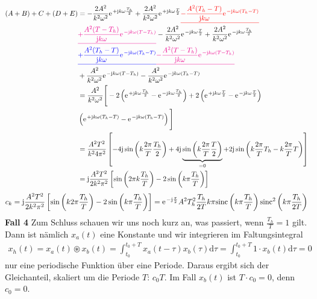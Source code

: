 \documentclass[11pt,a4paper,DIV=12]{scrartcl}
\newcommand{\ured}[1]{\textcolor{red}{\underline{#1}}}
\newcommand{\ublue}[1]{\textcolor{blue}{\underline{#1}}}
\newcommand{\umagenta}[1]{\textcolor{magenta}{\underline{#1}}}
\newcommand{\diff}{\mathrm{d}}
\newcommand{\sinc}{\mathrm{sinc}}
\begin{document}
%
%
%
\begin{align}
	(A+B)+C+(D+E)&=-\frac{2A^2}{k^2\omega^2}\e^{+\im k \omega \frac{T_h}{2}}+\frac{2A^2}{k^2\omega^2}\e^{+\im k \omega \frac{T}{2}}\ured{-\frac{A^2(T_h-T)}{\im k \omega}\e^{-\im k \omega (T_h-T)}}\nonumber \\
	&\umagenta{+\frac{A^2(T-T_h)}{\im k \omega}\e^{-\im k \omega(T-T_h)}}-\frac{2A^2}{k^2\omega^2}\e^{-\im k \omega \frac{T}{2}}+\frac{2A^2}{k^2\omega^2}\e^{-\im k \omega \frac{T_h}{2}}\nonumber\\
	&\ublue{+\frac{A^2(T_h-T)}{\im k \omega}\e^{-\im k \omega (T_h-T)}}\umagenta{-\frac{A^2(T-T_h)}{\im k \omega}\e^{-\im k \omega (T-T_h)}}\nonumber \\
	&+\frac{A^2}{k^2\omega^2}\e^{-\im k \omega (T-T_h)}-\frac{A^2}{k^2\omega^2}\e^{-\im k \omega (T_h-T)}\nonumber \\
	&=\frac{A^2}{k^2\omega^2}\Bigg [-2\left (\e^{+\im k \omega \frac{T_h}{2}}-\e^{-\im k \omega \frac{T_h}{2}}\right )+2\left (\e^{+\im k \omega \frac{T}{2}}-\e^{-\im k \omega \frac{T}{2}}\right )\nonumber \\
	&\left (\e^{+\im k \omega (T_h-T)}-\e^{-\im k \omega (T_h-T)}\right )\Bigg ]\nonumber \\
	&=\frac{A^2T^2}{k^24\pi^2}\left [-4\im \sin\left(k\frac{2\pi}{T}\frac{T_h}{2}\right)+4\im\underbrace{\sin\left(k\frac{2\pi}{T}\frac{T}{2}\right)}_{=0}+2\im\sin\left(k\frac{2\pi}{T}T_h-k\frac{2\pi}{T}T\right)\right ]\nonumber \\
	&=\im\frac{A^2T^2}{2k^2\pi^2}\left [\sin\left(2\pi k\frac{T_h}{T}\right)-2\sin\left(k\pi \frac{T_h}{T}\right)\right ]
\end{align}
%
%
%
\begin{align}
	c_k=\im\frac{A^2T^2}{2k^2\pi^2}\left [\sin\left(k2\pi\frac{T_h}{T}\right)-2\sin\left(k\pi\frac{T_h}{T}\right)\right ]
	=\e^{-\im\frac{\pi}{2}}A^2T_h^2\frac{T_h}{2T}k\pi\sinc\left(k\pi\frac{T_h}{T}\right)\sinc^2\left(k\pi\frac{T_h}{2T}\right)
\end{align}
%
\textbf{Fall 4}
%
Zum Schluss schauen wir uns noch kurz an, was passiert, wenn $\frac{T_h}{T}=1$
gilt.
%
Dann ist nämlich $x_{a}(t)$ eine Konstante und wir integrieren im
Faltungsintegral
%
\begin{align}
	x_{h}(t)=x_{a}(t)\circledast x_{b}(t)
	=\int_{t_0}^{t_0+T}x_{a}(t-\tau)x_{b}(\tau)\diff \tau
	=\int_{t_0}^{t_0+T}1\cdot x_{b}(t)\diff \tau = 0
\end{align}
%
nur eine periodische Funktion über eine Periode.
%
Daraus ergibt sich der Gleichanteil, skaliert um die Periode $T$: $c_0T$. Im Fall $x_b(t)$ ist $T\cdot c_0=0$, denn $c_0=0$.\
\end{document}

